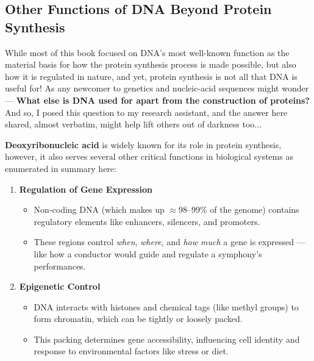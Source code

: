\documentclass[a4paper, 18pt]{book} %
\begin{document}

\begin{appendices}

\chapter{Other Functions of DNA Beyond Protein Synthesis}
\label{APPOTHERFUNC}


While most of this book focused on DNA's most well-known function as the material basis for how the protein synthesis process is made possible, but also how it is regulated in nature, and yet, protein synthesis is not all that DNA is useful for! As any newcomer to genetics and nucleic-acid sequences might wonder --- \textbf{What else is DNA used for apart from the construction of proteins?} And so, I posed this question to my research assistant\cite{copilot_dna_assistant}, and the answer here shared, almost verbatim, might help lift others out of darkness too...


\vspace{2em}

\textbf{Deoxyribonucleic acid} is widely known for its role in protein synthesis, however, it also serves several other critical functions in biological systems as enumerated in summary here:

\begin{enumerate}
    \item{ \textbf{Regulation of Gene Expression\cite{alberts2002molecular}} 
    

	\begin{itemize}
	\item Non-coding DNA (which makes up $\approx 98–99$\% of the genome) contains regulatory elements like enhancers, silencers, and promoters.
	\item These regions control \textit{when}, \textit{where}, and \textit{how much} a gene is expressed --- like how a conductor would guide and regulate a symphony's performances.
	\end{itemize}	    
    
    }

    \item{ \textbf{Epigenetic Control\cite{bird2007perceptions}} 

\begin{itemize}
	\item DNA interacts with histones and chemical tags (like methyl groups) to form chromatin, which can be tightly or loosely packed.
	\item This packing determines gene accessibility, influencing cell identity and response to environmental factors like stress or diet.
	\end{itemize}	    
    
}
\end{enumerate}
\end{appendices}
\end{document}

